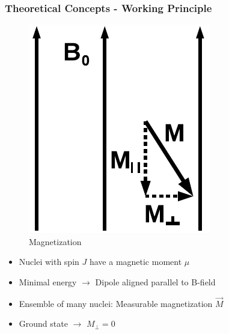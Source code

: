 \documentclass[aspectratio=169]{beamer}
\begin{document}
\begin{frame}
	\frametitle{Theoretical Concepts - Working Principle}
	
	\begin{minipage}[t]{\textwidth}
		\begin{minipage}[t]{0.3\textwidth}
			\centering
			\begin{figure}
				\includegraphics[height=0.3\textheight]{./Resources/magnetization_components.png}
				\caption{Magnetization}
				\label{fig:mag_components}
			\end{figure}
		\end{minipage}
		\begin{minipage}[t]{0.65\textwidth}
			\begin{itemize}
				\item Nuclei with spin $J$ have a magnetic moment $\mu$
				\item Minimal energy $\rightarrow$ Dipole aligned parallel to B-field
				\item Ensemble of many nuclei: Measurable magnetization $\vec{M}$
				\vspace{10pt}
				\item Ground state $\rightarrow$ $M_{\perp} = 0$
			\end{itemize}
			\vspace*{-5pt}
			\hrulefill
		\end{minipage}
	\end{minipage}
	\begin{minipage}[t]{\textwidth}
		\begin{minipage}[t]{0.3\textwidth}
			\centering
			\begin{figure}

\end{figure}
\end{minipage}
\end{minipage}
\end{frame}
\end{document}
